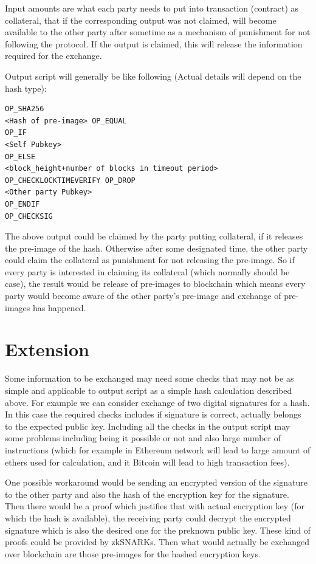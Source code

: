 \documentclass[]{article}
\begin{document}
Input amounts are what each party needs to put into transaction (contract) as collateral, that if the corresponding output was not claimed, will become available to the other party after sometime as a mechanism of punishment for not following the protocol. If the output is claimed, this will release the information required for the exchange.

Output script will generally be like following (Actual details will depend on the hash type):

\begin{verbatim}
OP_SHA256
<Hash of pre-image> OP_EQUAL
OP_IF
<Self Pubkey>
OP_ELSE
<block_height+number of blocks in timeout period> OP_CHECKLOCKTIMEVERIFY OP_DROP
<Other party Pubkey>
OP_ENDIF
OP_CHECKSIG
\end{verbatim}

The above output could be claimed by the party putting collateral, if it releases the pre-image of the hash. Otherwise after some designated time, the other party could claim the collateral as punishment for not releasing the pre-image. So if every party is interested in claiming its collateral (which normally should be case), the result would be release of pre-images to blockchain which means every party would become aware of the other party's pre-image and exchange of pre-images has happened.

\section{Extension}

Some information to be exchanged may need some checks that may not be as simple and applicable to output script as a simple hash calculation described above. For example we can consider exchange of two digital signatures for a hash. In this case the required checks includes if signature is correct, actually belongs to the expected public key. Including all the checks in the output script may some problems including being it possible or not and also large number of instructions (which for example in Ethereum network will lead to large amount of ethers used for calculation, and it Bitcoin will lead to high transaction fees).

One possible workaround would be sending an encrypted version of the signature to the other party and also the hash of the encryption key for the signature. Then there would be a proof which justifies that with actual encryption key (for which the hash is available), the receiving party could decrypt the encrypted signature which is also the desired one for the preknown public key. These kind of proofs could be provided by zkSNARKs\cite{ethzkSNARK}. Then what would actually be exchanged over blockchain are those pre-images for the hashed encryption keys.
\end{document}
